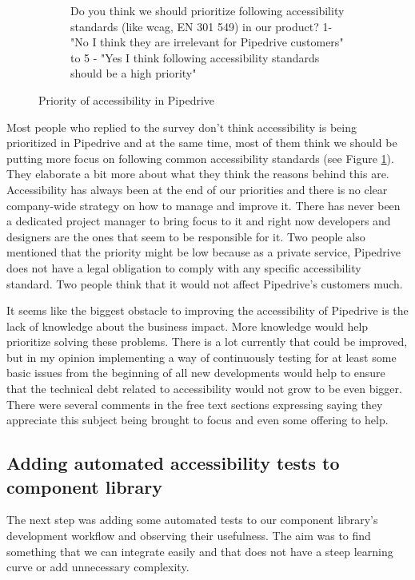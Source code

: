\documentclass{master_thesis}
\begin{document}
\begin{figure}[H]
\begin{subfigure}{0.45\textwidth}
		\caption{Do you think we should prioritize following accessibility standards (like \ac{wcag}, EN 301 549) in our product? 1- "No I think they are irrelevant for Pipedrive customers" to 5 - "Yes I think following accessibility standards should be a high priority" }
	\end{subfigure}
	\caption{Priority of accessibility in Pipedrive}
    \label{fig:a11y-priority}
\end{figure}

Most people who replied to the survey don't think accessibility is being prioritized in Pipedrive and at the same time, most of them think we should be putting more focus on following common accessibility standards (see Figure \ref{fig:a11y-priority}). They elaborate a bit more about what they think the reasons behind this are. Accessibility has always been at the end of our priorities and there is no clear company-wide strategy on how to manage and improve it. There has never been a dedicated project manager to bring focus to it
and right now developers and designers are the ones that seem to be responsible for it. Two people also mentioned that the priority might be low because as a private service, Pipedrive does not have a legal obligation to comply with any specific accessibility standard. Two people think that it would not affect Pipedrive's customers much.

It seems like the biggest obstacle to improving the accessibility of Pipedrive is the lack of knowledge about the business impact. More knowledge would help prioritize solving these problems. There is a lot currently that could be improved, but in my opinion implementing a way of continuously testing for at least some basic issues from the beginning of all new developments would help to ensure that the technical debt related to accessibility would not grow to be even bigger. There were several comments in the free text sections expressing saying they appreciate this subject being brought to focus and even some offering to help.

\subsection{Adding automated accessibility tests to component library}
The next step was adding some automated tests to our component library's development workflow and observing their usefulness. The aim was to find something that we can integrate easily and that does not have a steep learning curve or add unnecessary complexity.
\end{document}
